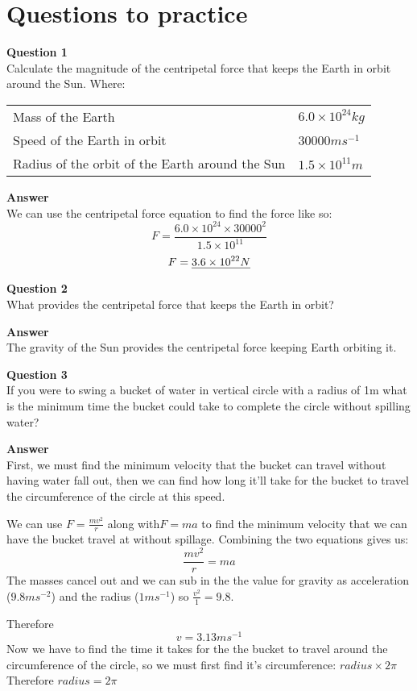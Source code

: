 \documentclass{article}
\begin{document}
\section*{Questions to practice}
\textbf{Question 1}\\
Calculate the magnitude of the centripetal force that keeps the Earth in orbit around the Sun.
Where:
\begin{center}
	\begin{tabular}{ l l }
		Mass of the Earth & $6.0\times10^{24}kg$ \\
		Speed of the Earth in orbit & $30000ms^{-1}$ \\
		Radius of the orbit of the Earth around the Sun & $1.5\times10^{11}m$
	\end{tabular}
\end{center}
\textbf{Answer}\\
We can use the centripetal force equation to find the force like so:
\[
	F = \frac{6.0\times10^{24} \times 30000^2}{1.5\times10^{11}}
\]
\[
	F = \uline{3.6 \times 10^{22}N}
\]

\textbf{Question 2}\\
What provides the centripetal force that keeps the Earth in orbit?

\textbf{Answer} \\
The gravity of the Sun provides the centripetal force keeping Earth orbiting it.

\textbf{Question 3}\\
If you were to swing a bucket of water in vertical circle with a radius of 1m what is the minimum time the bucket could take to complete the circle without spilling water?

\textbf{Answer} \\
First, we must find the minimum velocity that the bucket can travel without having water fall out, then we can find how long it'll take for the bucket to travel the circumference of the circle at this speed.

We can use $F = \frac{mv^2}{r}$ along with$F = ma$ to find the minimum velocity that we can have the bucket travel at without spillage. Combining the two equations gives us:
\[
	\frac{mv^2}{r} = ma
\]
The masses cancel out and we can sub in the the value for gravity as acceleration ($9.8ms^{-2}$) and the radius ($1ms^{-1}$) so $\frac{v^2}{1} = 9.8$.

Therefore 
\[
	v = 3.13ms^{-1}
\]
Now we have to find the time it takes for the the bucket to travel around the circumference of the circle, so we must first find it's circumference: $radius \times 2\pi$ Therefore $radius = 2\pi$
\end{document}
